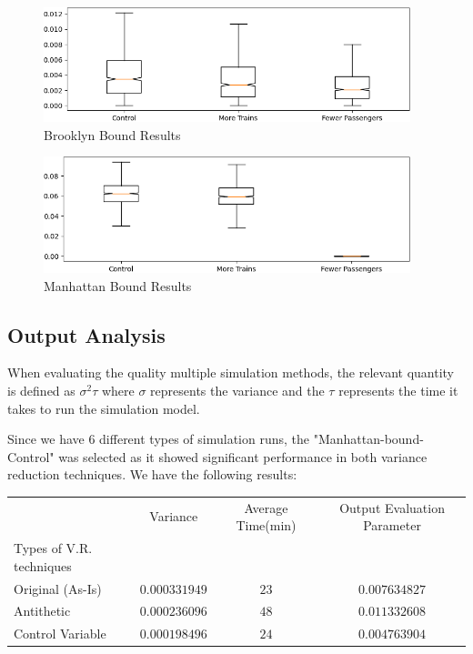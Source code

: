 \documentclass[12pt]{article}
\begin{document}
\begin{figure}[h]
	\centering
	\caption{Brooklyn Bound Results}
	\label{Fig:brooklyn-results}
	\includegraphics[width=0.95\textwidth]{./figures/brookly-bound-results.png}
\end{figure}

\begin{figure}
	\centering
	\caption{Manhattan Bound Results}
	\label{Fig:manhattan-results}
	\includegraphics[width=0.95\textwidth]{./figures/manhattan-bound-results.png}
\end{figure}

\subsection {Output Analysis}

When evaluating the quality multiple simulation methods, the relevant quantity is defined as $ \sigma^{2} \tau $ where $\sigma$ represents the variance and the $\tau$ represents the time it takes to run the simulation model.

Since we have 6 different types of simulation runs, the "Manhattan-bound-Control" was selected as it showed significant performance in both variance reduction techniques. We have the following results:

\begin{center}
	\begin{tabular}{ l| c c c}
		                 & Variance      & Average Time(min) & Output Evaluation Parameter\\
		Types of V.R. techniques & & &\\
		  \hline
		Original (As-Is) & $0.000331949$ & $23$              & $0.007634827$\\ 
		Antithetic       & $0.000236096$ & $48$              & $0.011332608$\\  
		Control Variable & $0.000198496$ & $24$              & $0.004763904$\\

	\end{tabular}
\end{center}
\end{document}

